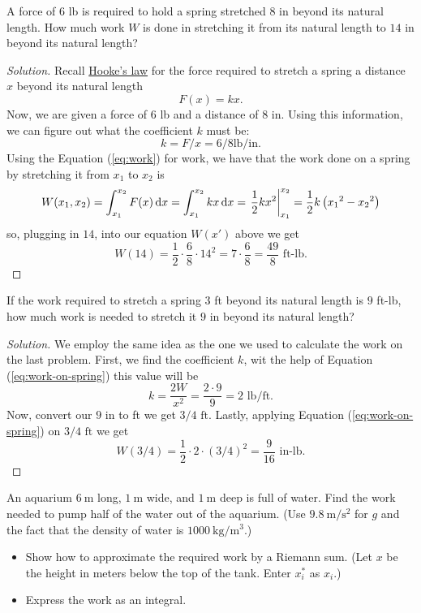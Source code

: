\begin{problem}[WebAssign, HW8, 3]
A force of $6$ lb is required to hold a spring stretched $8$ in beyond its
natural length. How much work $W$ is done in stretching it from its natural
length to $14$ in beyond its natural length?
\end{problem}
\begin{proof}[Solution]
Recall \href{https://en.wikipedia.org/wiki/Hooke's_law}{Hooke's law} for
the force required to stretch a spring a distance $x$  beyond its natural
length
\begin{equation}
\label{eq:hookes-law}
F(x)=kx.
\end{equation}
Now, we are given a force of $6$ lb and a distance of $8$ in. Using this
information, we can figure out what the coefficient $k$ must be:
\[
k=F/x=6/8\mathrm{lb}/\mathrm{in}.
\]
Using the Equation (\ref{eq:work}) for work, we have that the work done on
a spring by stretching it from $x_1$ to $x_2$ is
\begin{equation}
\label{eq:work-on-spring}
W(x_1,x_2)=\int_{x_1}^{x_2}F(x)\,\mathrm{d} x=\int_{x_1}^{x_2}kx\,\mathrm{d} x=\left.\frac{1}{2}kx^2\right|_{x_1}^{x_2}=\frac{1}{2}k\left({x_1}^2-{x_2}^2\right)
\end{equation}
so, plugging in $14$, into our equation $W(x')$ above we get
\[
W(14)=\frac{1}{2}\cdot \frac{6}{8}\cdot
14^2=7\cdot\frac{6}{8}=\boxed{\frac{49}{8}\text{ ft-lb}.}
\]
\end{proof}
\begin{problem}[WebAssign, HW8, 4]
If the work required to stretch a spring $3$ ft beyond its natural length is
$9$ ft-lb, how much work is needed to stretch it $9$ in beyond its natural
length?
\end{problem}
\begin{proof}[Solution]
We employ the same idea as the one we used to calculate the work on the
last problem. First, we find the coefficient $k$, wit the help of Equation
(\ref{eq:work-on-spring}) this value will be
\[
k=\frac{2W}{x^2}=\frac{2\cdot 9}{9}=2\text{ lb}/\text{ft}.
\]
Now, convert our $9\text{ in}$ to ft we get $3/4\text{ ft}$. Lastly,
applying Equation (\ref{eq:work-on-spring}) on $3/4\text{ ft}$ we get
\[
W(3/4)=\frac{1}{2}\cdot 2\cdot (3/4)^2=\boxed{\frac{9}{16}\text{ in-lb}.}
\]
\end{proof}
\begin{problem}[WebAssign, HW8, 5]
An aquarium $\SI{6}{\meter}$ long, $\SI{1}{\meter}$ wide, and
$\SI{1}{\meter}$ deep is full of water. Find the work needed to pump half
of the water out of the aquarium. (Use $\SI{9.8}{\meter/\second^2}$ for $g$
and the fact that the density of water is
$\SI{1000}{\kilo\gram/\meter^3}$.)
\begin{itemize}
\item Show how to approximate the required work by a Riemann sum. (Let $x$
  be the height in meters below the top of the tank. Enter $x_i^*$ as $x_i$.)
\item Express the work as an integral.
\end{itemize}
\end{problem}
